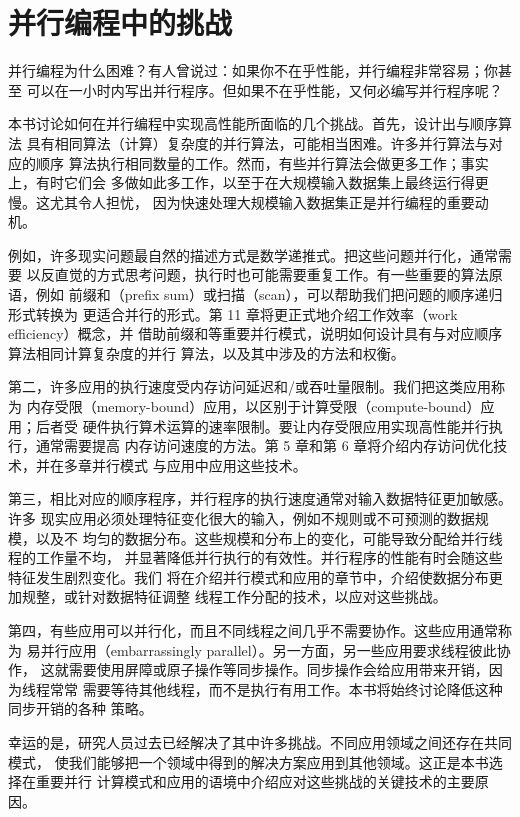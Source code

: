 \section{并行编程中的挑战}
\label{sec:parallel-programming-challenges}

并行编程为什么困难？有人曾说过：如果你不在乎性能，并行编程非常容易；你甚至
可以在一小时内写出并行程序。但如果不在乎性能，又何必编写并行程序呢？

本书讨论如何在并行编程中实现高性能所面临的几个挑战。首先，设计出与顺序算法
具有相同算法（计算）复杂度的并行算法，可能相当困难。许多并行算法与对应的顺序
算法执行相同数量的工作。然而，有些并行算法会做更多工作；事实上，有时它们会
多做如此多工作，以至于在大规模输入数据集上最终运行得更慢。这尤其令人担忧，
因为快速处理大规模输入数据集正是并行编程的重要动机。

例如，许多现实问题最自然的描述方式是数学递推式。把这些问题并行化，通常需要
以反直觉的方式思考问题，执行时也可能需要重复工作。有一些重要的算法原语，例如
前缀和（prefix sum）或扫描（scan），可以帮助我们把问题的顺序递归形式转换为
更适合并行的形式。第 11 章将更正式地介绍工作效率（work efficiency）概念，并
借助前缀和等重要并行模式，说明如何设计具有与对应顺序算法相同计算复杂度的并行
算法，以及其中涉及的方法和权衡。

第二，许多应用的执行速度受内存访问延迟和/或吞吐量限制。我们把这类应用称为
内存受限（memory-bound）应用，以区别于计算受限（compute-bound）应用；后者受
硬件执行算术运算的速率限制。要让内存受限应用实现高性能并行执行，通常需要提高
内存访问速度的方法。第 5 章和第 6 章将介绍内存访问优化技术，并在多章并行模式
与应用中应用这些技术。

第三，相比对应的顺序程序，并行程序的执行速度通常对输入数据特征更加敏感。许多
现实应用必须处理特征变化很大的输入，例如不规则或不可预测的数据规模，以及不
均匀的数据分布。这些规模和分布上的变化，可能导致分配给并行线程的工作量不均，
并显著降低并行执行的有效性。并行程序的性能有时会随这些特征发生剧烈变化。我们
将在介绍并行模式和应用的章节中，介绍使数据分布更加规整，或针对数据特征调整
线程工作分配的技术，以应对这些挑战。

第四，有些应用可以并行化，而且不同线程之间几乎不需要协作。这些应用通常称为
易并行应用（embarrassingly parallel）。另一方面，另一些应用要求线程彼此协作，
这就需要使用屏障或原子操作等同步操作。同步操作会给应用带来开销，因为线程常常
需要等待其他线程，而不是执行有用工作。本书将始终讨论降低这种同步开销的各种
策略。

幸运的是，研究人员过去已经解决了其中许多挑战。不同应用领域之间还存在共同模式，
使我们能够把一个领域中得到的解决方案应用到其他领域。这正是本书选择在重要并行
计算模式和应用的语境中介绍应对这些挑战的关键技术的主要原因。

